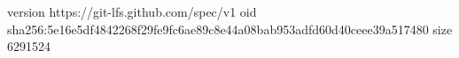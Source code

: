 version https://git-lfs.github.com/spec/v1
oid sha256:5e16e5df4842268f29fe9fc6ae89c8e44a08bab953adfd60d40ceee39a517480
size 6291524
